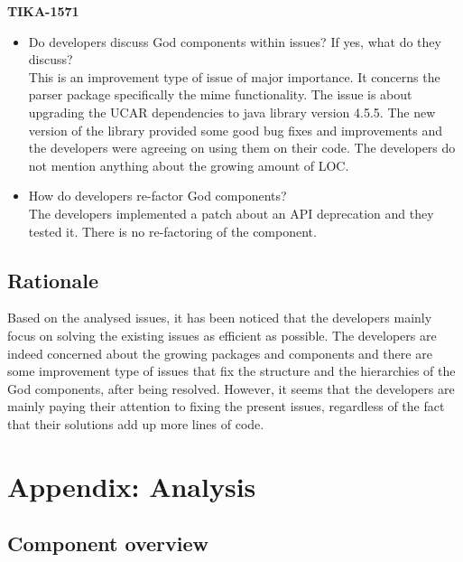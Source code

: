 \documentclass{article}
\begin{document}
\textbf{TIKA-1571}
\begin{itemize}
    \item Do developers discuss God components within issues? If yes, what do they discuss?\\
    This is an improvement type of issue of major importance. It concerns the parser package specifically the mime functionality. The issue is about upgrading the UCAR dependencies to java library version 4.5.5. The new version of the library provided some good bug fixes and improvements and the developers were agreeing on using them on their code. The developers do not mention anything about the growing amount of LOC.
    \item How do developers re-factor God components?\\
    The developers implemented a patch about an API deprecation and they tested it. There is no re-factoring of the component.
\end{itemize}

\subsection{Rationale}
Based on the analysed issues, it has been noticed that the developers mainly focus on solving the existing issues as efficient as possible. The developers are indeed concerned about the growing packages and components and there are some improvement type of issues that fix the structure and the hierarchies of the God components, after being resolved. However, it seems that the developers are mainly paying their attention to fixing the present issues, regardless of the fact that their solutions add up more lines of code. 


\appendix
\section{Appendix: Analysis}
\subsection{Component overview}
\end{document}
